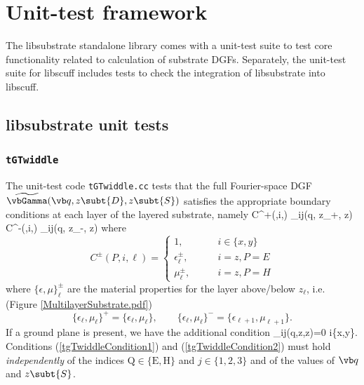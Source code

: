 \documentclass[letterpaper]{article}
\renewcommand{\wt}{\widetilde}
\begin{document}
\newpage
\section{Unit-test framework}

The {\sc libsubstrate} standalone library comes with
a unit-test suite to test core functionality related
to calculation of substrate DGFs. Separately, the
unit-test suite for {\sc libscuff} includes tests
to check the integration of {\sc libsubstrate} 
into {\sc libscuff}.

\subsection{{\sc libsubstrate} unit tests}

\subsubsection{\texttt{tGTwiddle}}

The unit-test code \texttt{tGTwiddle.cc} tests that the full
Fourier-space DGF $\wt \vbGamma(\vb q, z\subt{D}, z\subt{S})$ satisfies the appropriate
boundary conditions at each layer of the layered substrate, namely
{ C^+(,i,\ell) \wt{\Gamma}_{ij}(\vb q, z_\ell+\eta, z)
   C^-(,i,\ell) \wt{\Gamma}_{ij}(\vb q, z_\ell-\eta, z)
}
where
$$ C^\pm(P, i, \ell)=
   \begin{cases}
    1, \qquad                 &i \in \{x,y\} \\
    \epsilon_\ell^\pm, \qquad &i=z, P=E \\
    \mu_\ell^\pm,      \qquad &i=z, P=H
   \end{cases}
$$
where $\{\epsilon,\mu\}_\ell^\pm$ are the
material properties for the layer above/below $z_\ell$, i.e.
(Figure \ref{MultilayerSubstrate.pdf})
$$ \{\epsilon_\ell, \mu_\ell\}^+ = \{\epsilon_\ell, \mu_\ell\},
   \qquad
   \{\epsilon_\ell, \mu_\ell\}^- = \{\epsilon_{\ell+1}, \mu_{\ell+1}\}.
$$
If a ground plane is present, we have the additional condition
{\wt{\Gamma}_{ij}(q,z,z)=0  i\in \{x,y\}.}
Conditions (\ref{tgTwiddleCondition1}) and (\ref{tgTwiddleCondition2})
must hold \textit{independently} of the indices $\text{Q}\in\{\text{E},\text{H}\}$
and $j\in\{1,2,3\}$ and of the values of $\vb q$ and $z\subt{S}$.
\end{document}
